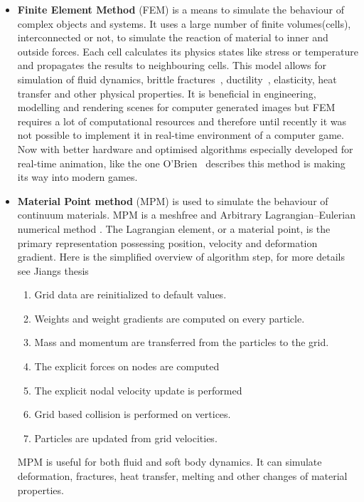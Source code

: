 \begin{itemize}

\item \textbf{Finite Element Method} (FEM) is a means to simulate the behaviour of complex objects and systems.  It uses a large number of finite volumes(cells), interconnected or not, to simulate the reaction of material to inner and outside forces. Each cell calculates its physics states like stress or temperature and propagates the results to neighbouring cells. This model allows for simulation of fluid dynamics, brittle fractures~\cite{brittlefracture}, ductility~\cite{ductilefracture}, elasticity, heat transfer and other physical properties. It is beneficial in engineering, modelling and rendering scenes for computer generated images but FEM requires a lot of computational resources and therefore until recently it was not possible to implement it in real-time environment of a computer game. Now with better hardware and optimised algorithms especially developed for real-time animation, like the one O'Brien~\cite{femingames} describes this method is making its way into modern games.

\item \textbf{Material Point method} (MPM) is used to simulate the behaviour of continuum materials. MPM is a meshfree and Arbitrary Lagrangian–Eulerian numerical method \cite{ALE}. The Lagrangian element, or a material point, is the primary representation possessing position, velocity and deformation gradient. Here is the simplified overview of algorithm step, for more details see Jiangs thesis~\cite{jiang2015material} 
\begin{enumerate}
    \item Grid data are reinitialized to default values.
    \item Weights and weight gradients are computed on every particle.
    \item Mass and momentum are transferred from the particles to the grid.
    \item The explicit forces on nodes are computed
    \item The explicit nodal velocity update is performed
    \item Grid based collision is performed on vertices.
    \item Particles are updated from grid velocities.
\end{enumerate}
MPM is useful for both fluid and soft body dynamics. It can simulate deformation, fractures, heat transfer, melting and other changes of material properties.


\end{itemize}
